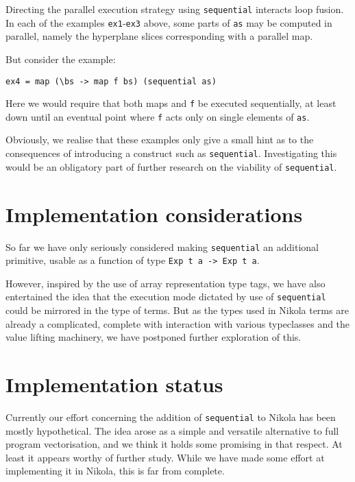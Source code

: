 Directing the parallel execution strategy using \texttt{sequential} interacts
loop fusion.  In each of the examples \texttt{ex1}-\texttt{ex3} above, some
parts of \texttt{as} may be computed in parallel, namely the hyperplane slices
corresponding with a parallel map.

But consider the example:
\begin{verbatim}
ex4 = map (\bs -> map f bs) (sequential as)
\end{verbatim}

Here we would require that both maps and \texttt{f} be executed sequentially,
at least down until an eventual point where \texttt{f} acts only on single
elements of \texttt{as}.

Obviously, we realise that these examples only give a small hint as to the
consequences of introducing a construct such as \texttt{sequential}.
Investigating this would be an obligatory part of further research on the
viability of \texttt{sequential}.

\section{Implementation considerations}

So far we have only seriously considered making \texttt{sequential} an
additional primitive, usable as a function of type \texttt{Exp t a -> Exp t a}.

However, inspired by the use of array representation type tags, we have also
entertained the idea that the execution mode dictated by use of
\texttt{sequential} could be mirrored in the type of terms. But as the types
used in Nikola terms are already a complicated, complete with interaction with
various typeclasses and the value lifting machinery, we have postponed further
exploration of this.

\section{Implementation status}

Currently our effort concerning the addition of \texttt{sequential} to Nikola
has been mostly hypothetical. The idea arose as a simple and versatile
alternative to full program vectorisation, and we think it holds some promising
in that respect. At least it appears worthy of further study.  While we have
made some effort at implementing it in Nikola, this is far from complete.

